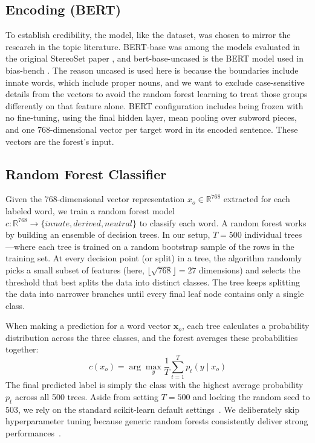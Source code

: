 \documentclass[sigconf]{acmart}
\begin{document}
\subsection{Encoding (BERT)}
To establish credibility, the model, like the dataset, was chosen to mirror the research in the topic literature. BERT-base was among the models evaluated in the original StereoSet paper \cite{nadeem2020stereoset}, and bert-base-uncased is the BERT model used in bias-bench \cite{meade-etal-2022-empirical}. The reason uncased is used here is because the boundaries include innate words, which include proper nouns, and we want to exclude case-sensitive details from the vectors to avoid the random forest learning to treat those groups differently on that feature alone. BERT configuration includes being frozen with no fine-tuning, using the final hidden layer, mean pooling over subword pieces, and one 768-dimensional vector per target word in its encoded sentence. These vectors are the forest’s input.

\subsection{Random Forest Classifier}
Given the 768-dimensional vector representation $x_o \in \mathbb{R}^{768}$ extracted for each labeled word, we train a random forest model~\cite{breiman2001random} $c: \mathbb{R}^{768} \rightarrow \{\textit{innate}, \textit{derived}, \textit{neutral}\}$ to classify each word. A random forest works by building an ensemble of decision trees. In our setup, $T = 500$ individual trees---where each tree is trained on a random bootstrap sample of the rows in the training set. At every decision point (or split) in a tree, the algorithm randomly picks a small subset of features (here, $\lfloor\sqrt{768}\rfloor = 27$ dimensions) and selects the threshold that best splits the data into distinct classes. The tree keeps splitting the data into narrower branches until every final leaf node contains only a single class.

When making a prediction for a word vector $\mathbf{x}_o$, each tree calculates a probability distribution across the three classes, and the forest averages these probabilities together:
$$c(x_o) = \arg\max_{y} \frac{1}{T} \sum_{t=1}^{T} p_t(y \mid x_o)$$
The final predicted label is simply the class with the highest average probability $p_t$ across all 500 trees. Aside from setting $T = 500$ and locking the random seed to 503, we rely on the standard scikit-learn default settings~\cite{pedregosa2011scikit}. We deliberately skip hyperparameter tuning because generic random forests consistently deliver strong performances~\cite{probst2019hyperparameters}.
\end{document}
